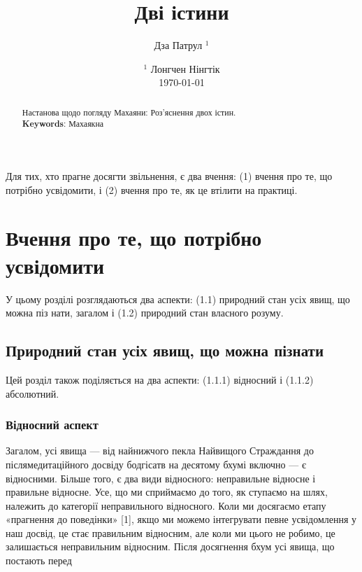 \documentclass{article}
\begin{document}
\title{Дві істини}
\author{Дза Патрул $^1$}
\date{ $^1$ Лонгчен Нінгтік \\ \today }

\maketitle

\begin{abstract}Настанова щодо погляду Махаяни: Роз’яснення двох істин. \\
\textbf{Keywords}: Махаякна
\end{abstract}

\ifincludeTOC
  \tableofcontents
\fi

\newpage

Для тих, хто прагне досягти звільнення, є два вчення: (1) вчення про те, що потрібно усвідомити, і (2) вчення про те, як це втілити на практиці.

\section{Вчення про те, що потрібно усвідомити}

У цьому розділі розглядаються два аспекти: (1.1) природний стан усіх явищ, що можна піз нати, загалом і (1.2) природний стан власного розуму.

\subsection{Природний стан усіх явищ, що можна пізнати}

Цей розділ також поділяється на два аспекти: (1.1.1) відносний і (1.1.2) абсолютний.

\subsubsection{Відносний аспект}
Загалом, усі явища — від найнижчого пекла Найвищого Страждання до післямедитаційного досвіду бодгісатв на десятому бхумі включно — є відносними. Більше того, є два види відносного: неправильне відносне і правильне відносне. Усе, що ми сприймаємо до того, як ступаємо на шлях, належить до категорії неправильного відносного. Коли ми досягаємо етапу «прагнення до поведінки» [1], якщо ми можемо інтегрувати певне усвідомлення у наш досвід, це стає правильним відносним, але коли ми цього не робимо, це залишається неправильним відносним. Після досягнення бхум усі явища, що постають перед
\end{document}
